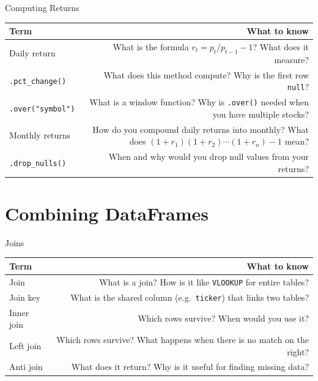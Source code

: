 \documentclass[9pt,aspectratio=169]{beamer}
\begin{document}
\begin{frame}{Computing Returns}

\begin{tabular}{@{}lR@{}}
\toprule
\textbf{Term} & \textbf{What to know} \\
\midrule
\alert{Daily return} & What is the formula $r_t = p_t / p_{t-1} - 1$? What does it measure? \\[0.8em]
\alert{\texttt{.pct\_change()}} & What does this method compute? Why is the first row \texttt{null}? \\[0.8em]
\alert{\texttt{.over("symbol")}} & What is a window function? Why is \texttt{.over()} needed when you have multiple stocks? \\[0.8em]
\alert{Monthly returns} & How do you compound daily returns into monthly? What does $(1+r_1)(1+r_2)\cdots(1+r_n)-1$ mean? \\[0.8em]
\alert{\texttt{.drop\_nulls()}} & When and why would you drop null values from your returns? \\
\bottomrule
\end{tabular}

\end{frame}


\section{Combining DataFrames}

\begin{frame}{Joins}

\begin{tabular}{@{}lR@{}}
\toprule
\textbf{Term} & \textbf{What to know} \\
\midrule
\alert{Join} & What is a join? How is it like \texttt{VLOOKUP} for entire tables? \\[0.8em]
\alert{Join key} & What is the shared column (e.g.\ \texttt{ticker}) that links two tables? \\[0.8em]
\alert{Inner join} & Which rows survive? When would you use it? \\[0.8em]
\alert{Left join} & Which rows survive? What happens when there is no match on the right? \\[0.8em]
\alert{Anti join} & What does it return? Why is it useful for finding missing data? \\
\bottomrule
\end{tabular}

\end{frame}
\end{document}
